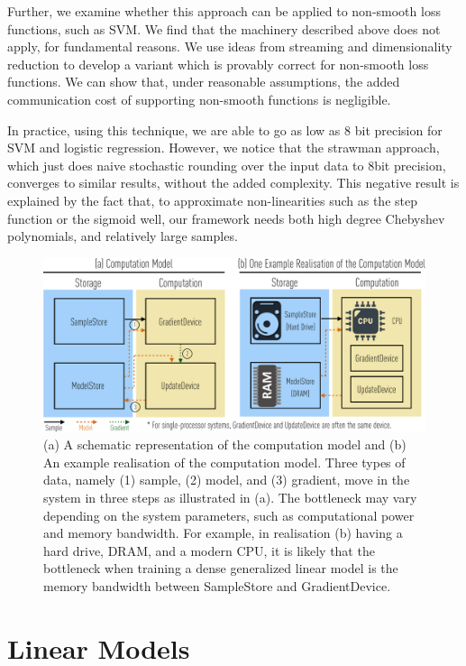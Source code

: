 \documentclass{article}
\begin{document}
Further, we examine whether this approach can be applied to non-smooth loss functions, such as SVM. 
We find that the  machinery described above does not apply, for fundamental reasons. 
We use ideas from streaming and dimensionality reduction to develop a variant which is provably correct for non-smooth loss functions. 
We can show that, under reasonable assumptions, the added communication cost of supporting non-smooth functions is negligible. 

\vspace{-0.5em}
In practice, using this technique, we are
able to go as low as 8 bit precision for SVM and logistic regression. 
However, we notice that the strawman approach, which just
does naive stochastic rounding over the input data to 8bit precision, converges to similar results, 
without the added complexity. 
This negative result is explained by the fact that, to approximate non-linearities such as the step function or the sigmoid well, our framework needs both high degree Chebyshev polynomials, and relatively large samples. 

\begin{figure}[t]
\centering   
\includegraphics[scale=0.27]{compmodel-pdfcrop}
\caption{(a) A schematic representation of the computation model and (b) An example realisation
of the computation model. Three types of
data, namely (1) sample, (2) model, and (3)
gradient, move in the system in three
steps as illustrated in (a). The bottleneck may
vary depending on the
 system parameters,
such as computational power and memory bandwidth. For example, in 
realisation (b) having a hard drive, DRAM, and a
modern CPU, it is likely that the  bottleneck when training 
a dense generalized linear model is the
memory bandwidth between SampleStore
and GradientDevice.} 
\label{fig:model}
\end{figure}


\vspace{-0.5em}
\section{Linear Models}
\end{document}
